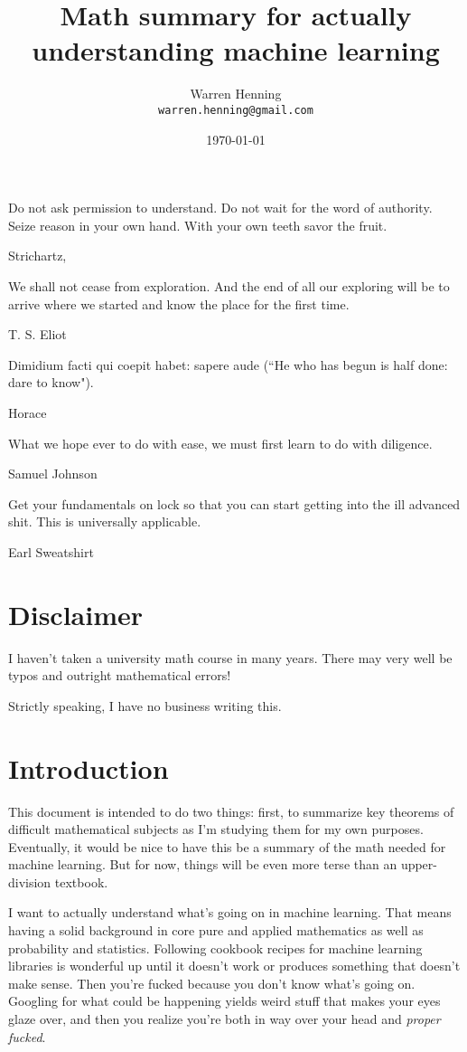 \documentclass{article}
\theoremstyle{definition}
\begin{document}
\title{Math summary for actually understanding machine learning}
\author{Warren Henning\\\texttt{warren.henning@gmail.com}}
\date{\today}

\maketitle

\tableofcontents

\pagebreak

\epigraph{Do not ask permission to understand. Do not wait for the word of authority. Seize reason in your own hand. With your own teeth savor the fruit.}{Strichartz, \cite{strichartz}}

\epigraph{We shall not cease from exploration. And the end of all our exploring will be to arrive where we started and know the place for the first time.}{T. S. Eliot}

\epigraph{Dimidium facti qui coepit habet: sapere aude (``He who has begun is half done: dare to know").}{Horace}

\epigraph{What we hope ever to do with ease, we must first learn to do with diligence.}{Samuel Johnson}

\epigraph{Get your fundamentals on lock so that you can start getting into the ill advanced shit. This is universally applicable.}{Earl Sweatshirt}

\section{Disclaimer}

I haven't taken a university math course in many years. There may very well
be typos and outright mathematical errors!

Strictly speaking, I have no business writing this.

\section{Introduction}

This document is intended to do two things: first, to summarize key theorems of difficult mathematical subjects as I'm studying them for my own purposes. Eventually, it would be nice to have this be a summary of the math needed for machine learning. But for now, things will be even more terse than an upper-division textbook.

I want to actually understand what's going on in machine learning. That means having a solid background in core pure and applied mathematics as well as probability and statistics. Following cookbook recipes for machine learning libraries is wonderful up until it doesn't work or produces something that doesn't make sense. Then you're fucked because you don't know what's going on. Googling for what could be happening yields weird stuff that makes your eyes glaze over, and then you realize you're both in way over your head and \emph{proper fucked}.
\end{document}
